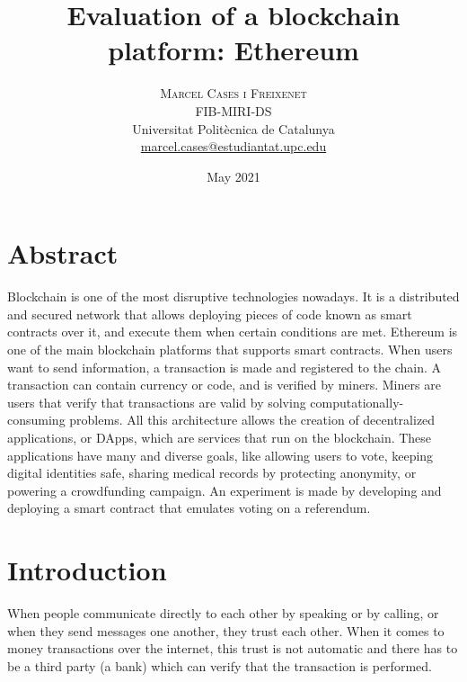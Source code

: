 \documentclass[10pt]{article}
\begin{document}
\title{%
	\huge\bfseries Evaluation of a blockchain platform: Ethereum \\
}
\date{\normalsize May 2021}
\author{
	{\scshape Marcel Cases i Freixenet} \\
	{\normalsize FIB-MIRI-DS} \\
	{\normalsize Universitat Politècnica de Catalunya} \\
	{\normalsize\href{mailto:marcel.cases@estudiantat.upc.edu}{marcel.cases@estudiantat.upc.edu}}
}

\maketitle

\begin{multicols}{2}
	
\section*{Abstract}


Blockchain is one of the most disruptive technologies nowadays. It is a distributed and secured network that allows deploying pieces of code known as smart contracts over it, and execute them when certain conditions are met. Ethereum is one of the main blockchain platforms that supports smart contracts. When users want to send information, a transaction is made and registered to the chain. A transaction can contain currency or code, and is verified by miners. Miners are users that verify that transactions are valid by solving computationally-consuming problems. All this architecture allows the creation of decentralized applications, or DApps, which are services that run on the blockchain. These applications have many and diverse goals, like allowing users to vote, keeping digital identities safe, sharing medical records by protecting anonymity, or powering a crowdfunding campaign. An experiment is made by developing and deploying a smart contract that emulates voting on a referendum.

\section{Introduction}

When people communicate directly to each other by speaking or by calling, or when they send messages one another, they trust each other. When it comes to money transactions over the internet, this trust is not automatic and there has to be a third party (a bank) which can verify that the transaction is performed.\\


\end{multicols}
\end{document}
